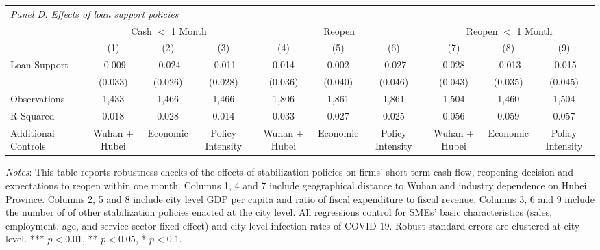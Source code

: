 \documentclass{article}
\begin{document}
\begin{table}
\begin{center}
{\begin{threeparttable}
\begin{tabular}{lccccccccc}
\hline
\multicolumn{10}{l}{\textit{Panel D. Effects of loan support policies}} \\
             & \multicolumn{3}{c}{Cash $<$ 1 Month}        & \multicolumn{3}{c}{Reopen}        & \multicolumn{3}{c}{Reopen $<$ 1 Month} \\
             & (1)       & (2)        & (3)            & (4)       & (5)        & (6)            & (7)       & (8)       & (9)      \\
Loan Support & -0.009    & -0.024     & -0.011         & 0.014     & 0.002      & -0.027         & 0.028   & -0.013       & -0.015                    \\
             & (0.033)   & (0.026)    & (0.028)        & (0.036)   & (0.040)    & (0.046)        & (0.043) & (0.035)     & (0.045)                   \\
Observations & 1,433     & 1,466      & 1,466          & 1,806     & 1,861      & 1,861          & 1,504   & 1,460       & 1,504                     \\
R-Squared    & 0.018     & 0.028      & 0.014          & 0.033     & 0.027      & 0.025          & 0.056   & 0.059       & 0.057                     \\
Additional Controls      & Wuhan + Hubei  & Economic   & Policy Intensity   & Wuhan + Hubei   & Economic   & Policy Intensity    & Wuhan + Hubei  & Economic  & Policy Intensity            \\ \hline
\end{tabular}
\begin{tablenotes}[flushleft]
\item \small \textit{Notes}: This table reports robustness checks of the effects of stabilization policies on firms' short-term cash flow, reopening decision and expectations to reopen within one month. Columns 1, 4 and 7 include geographical distance to Wuhan and industry dependence on Hubei Province. Columns 2, 5 and 8 include city level GDP per capita and ratio of fiscal expenditure to fiscal revenue. Columns 3, 6 and 9 include the number of of other stabilization policies enacted at the city level. All regressions control for SMEs' basic characteristics (sales, employment, age, and service-sector fixed effect) and city-level infection rates of COVID-19. Robust standard errors are clustered at city level. *** $p<0.01$, ** $p<0.05$, * $p<0.1$. 

\end{tablenotes}
\end{threeparttable}
}
\end{center}
\end{table}
\end{document}
